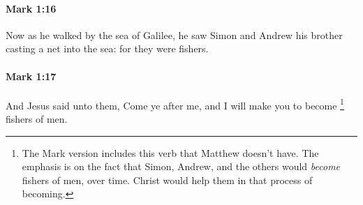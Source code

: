 		\paragraph{Mark 1:16} %
			\label{MARK-1-16}

			Now as he walked by the sea of Galilee, he saw Simon and Andrew his brother casting a net into the sea: for they were fishers.

			\begin{framed}
			\scriptsize
				\begin{compactdesc}
					\item[SBLG] 
				\end{compactdesc}
			\end{framed}

		\paragraph{Mark 1:17} %
			\label{MARK-1-17}

			And Jesus said unto them, Come ye after me, and I will make you to become%
				\footnote{%
					The Mark version includes this verb  that Matthew doesn't have. The emphasis is on the fact that Simon, Andrew, and the others would \textit{become} fishers of men, over time. Christ would help them in that process of becoming.
					}
			fishers of men.


